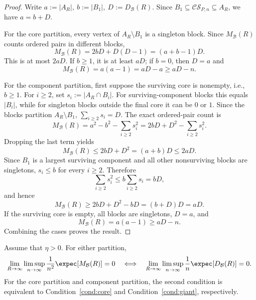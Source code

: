 \documentclass[11pt]{article}
\theoremstyle{plain}
\begin{document}
\begin{proof}
Write
\(
a:=|A_R|,\ b:=|B_1|,\ D:=D_{\mathcal B}(R).
\)
Since $B_1\subseteq\mathcal{CS}_{P,n}\subseteq A_R$, we have $a=b+D$.

For the core partition, every vertex of $A_R\setminus B_1$ is a singleton
block. Since $M_{\mathcal B}(R)$ counts ordered pairs in different blocks,
\[
M_{\mathcal B}(R)=2bD+D(D-1)=(a+b-1)D.
\]
This is at most $2aD$. If $b\ge1$, it is at least $aD$; if $b=0$, then
$D=a$ and
\[
M_{\mathcal B}(R)=a(a-1)=aD-a\ge aD-n.
\]

For the component partition, first suppose the surviving core is nonempty, i.e.,
$b\ge1$. For $i\ge2$, set
\(
s_i:=|A_R\cap B_i|.
\)
For surviving-component blocks this equals $|B_i|$, while for singleton blocks
outside the final core it can be $0$ or $1$. Since the blocks partition
$A_R\setminus B_1$,
\(
\sum_{i\ge2}s_i=D.
\)
The exact ordered-pair count is
\[
M_{\mathcal B}(R)
=a^2-b^2-\sum_{i\ge2}s_i^2
=2bD+D^2-\sum_{i\ge2}s_i^2.
\]
Dropping the last term yields
\[
M_{\mathcal B}(R)\le2bD+D^2=(a+b)D\le2aD.
\]
Since $B_1$ is a largest surviving component and all other nonsurviving blocks
are singletons, $s_i\le b$ for every $i\ge2$. Therefore
\[
\sum_{i\ge2}s_i^2\le b\sum_{i\ge2}s_i=bD,
\]
and hence
\[
M_{\mathcal B}(R)\ge2bD+D^2-bD=(b+D)D=aD.
\]
If the surviving core is empty, all blocks are singletons, $D=a$, and
\[
M_{\mathcal B}(R)=a(a-1)\ge aD-n.
\]
Combining the cases proves the result.
\end{proof}

\begin{lemma}\label{lem:equivalence}
Assume that $\eta>0$. For either partition,
\[
\lim_{R\to\infty}\limsup_{n\to\infty}\frac1{n^2}\expec[M_{\mathcal{B}}(R)]=0
\quad\Longleftrightarrow\quad
\lim_{R\to\infty}\limsup_{n\to\infty}\frac1n\expec[D_{\mathcal{B}}(R)]=0.
\]
For the core partition and component partition, the second condition is equivalent to Condition~\ref{cond:core} and Condition~\ref{cond:giant}, respectively.
\end{lemma}
\end{document}
